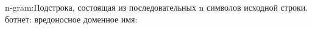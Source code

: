 n-gram:Подстрока, состоящая из последовательных n символов исходной строки.
ботнет:
вредоносное доменное имя:
\clearpage